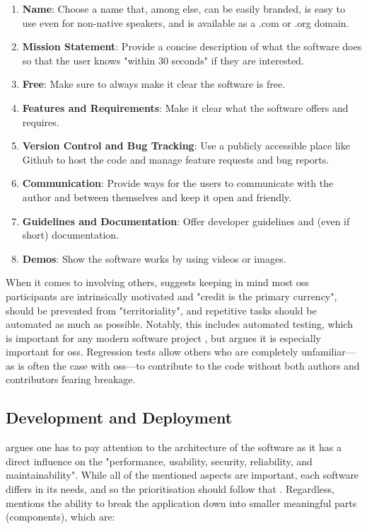 \begin{enumerate}
    \item \textbf{Name}: Choose a name that, among else, can be easily branded, is easy to use even for non-native speakers, and is available as a .com or .org domain.
    \item \textbf{Mission Statement}: Provide a concise description of what the software does so that the user knows "within 30 seconds" \parencite{Fogel_2022} if they are interested.
    \item \textbf{Free}: Make sure to always make it clear the software is free.
    \item \textbf{Features and Requirements}: Make it clear what the software offers and requires.
    \item \textbf{Version Control and Bug Tracking}: Use a publicly accessible place like Github to host the code and manage feature requests and bug reports.
    \item \textbf{Communication}: Provide ways for the users to communicate with the author and between themselves and keep it open and friendly.
    \item \textbf{Guidelines and Documentation}: Offer developer guidelines and (even if short) documentation.
    \item \textbf{Demos}: Show the software works by using videos or images.
\end{enumerate}

When it comes to involving others, \textcite[Chapter~8]{Fogel_2022} suggests keeping in mind most \gls{oss} participants are intrinsically motivated and "credit is the primary currency", should be prevented from "territoriality", and repetitive tasks should be automated as much as possible.
Notably, this includes automated testing, which is important for any modern software project \parencite[Chapter~9]{Sommerville_2019}, but \textcite[Chapter~8]{Fogel_2022} argues it is especially important for \gls{oss}.
Regression tests allow others who are completely unfamiliar---as is often the case with \gls{oss}---to contribute to the code without both authors and contributors fearing breakage.

\subsection{Development and Deployment}

\textcite[Chapter~4]{Sommerville_2019} argues one has to pay attention to the architecture of the software as it has a direct influence on the "performance, usability, security, reliability, and maintainability".
While all of the mentioned aspects are important, each software differs in its needs, and so the prioritisation should follow that \parencite[Chapter~4]{Sommerville_2019}.
Regardless, \textcite[Chapter~4]{Sommerville_2019} mentions the ability to break the application down into smaller meaningful parts (components), which are:

